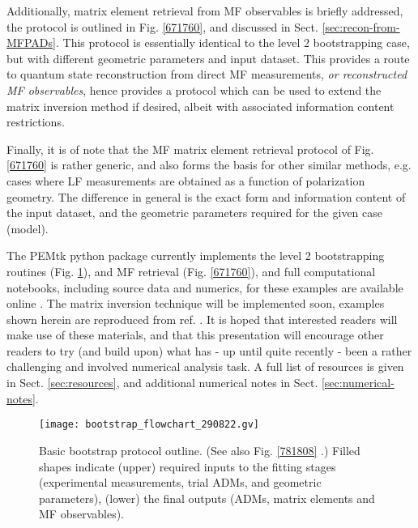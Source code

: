 \documentclass[10pt]{article}
\begin{document}
Additionally, matrix element retrieval from MF observables is briefly addressed, the protocol is outlined in Fig. \ref{671760}, and discussed in Sect. \ref{sec:recon-from-MFPADs}. This protocol is essentially identical to the level 2 bootstrapping case, but with different geometric parameters and input dataset. This provides a route to quantum state reconstruction from direct MF measurements, \textit{or reconstructed MF observables}, hence provides a protocol which can be used to extend the matrix inversion method if desired, albeit with associated information content restrictions.

Finally, it is of note that the MF matrix element retrieval protocol of Fig. \ref{671760} is rather generic, and also forms the basis for other similar methods, e.g. cases where LF measurements are obtained as a function of polarization geometry. The difference in general is the exact form and information content of the input dataset, and the geometric parameters required for the given case (model).


The PEMtk python package \cite{hockett2021PEMtkDocs, hockett2021PEMtkGithub} currently implements the level 2 bootstrapping routines (Fig. \ref{807606}), and MF retrieval (Fig. \ref{671760}), and full computational notebooks, including source data and numerics, for these examples are available online \cite{hockett2022MFreconFigshare}. The matrix inversion technique will be implemented soon, examples shown herein are reproduced from ref. \cite{gregory2021MolecularFramePhotoelectron}. It is hoped that interested readers will make use of these materials, and that this presentation will encourage other readers to try (and build upon) what has - up until quite recently - been a rather challenging and involved numerical analysis task. A full list of resources is given in Sect. \ref{sec:resources}, and additional numerical notes in Sect. \ref{sec:numerical-notes}.

\begin{figure}[]
\begin{center}
\texttt{[image: bootstrap\_flowchart\_290822.gv]}
\caption{Basic bootstrap protocol outline. (See also Fig. \ref{781808} .) Filled shapes indicate (upper) required inputs to the fitting stages (experimental measurements, trial ADMs, and geometric parameters), (lower) the final outputs (ADMs, matrix elements and MF observables).\label{807606}}
\end{center}
\end{figure}
\end{document}
